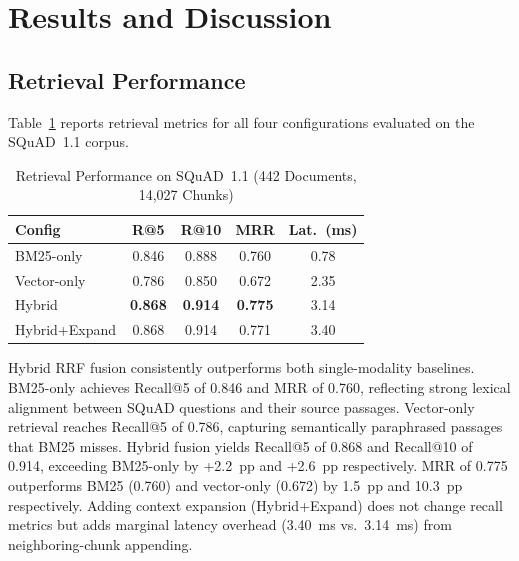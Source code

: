 \documentclass[conference]{IEEEtran}
\begin{document}
\section{Results and Discussion}

\subsection{Retrieval Performance}

Table~\ref{tab:retrieval} reports retrieval metrics for all four
configurations evaluated on the SQuAD~1.1 corpus.

\begin{table}[!t]
  \renewcommand{\arraystretch}{1.2}
  \caption{Retrieval Performance on SQuAD~1.1
           (442 Documents, 14{,}027 Chunks)}
  \label{tab:retrieval}
  \begin{center}
  \begin{tabular}{lcccc}
  \hline
  \textbf{Config} & \textbf{R@5} & \textbf{R@10} & \textbf{MRR}
                  & \textbf{Lat.\ (ms)} \\
  \hline
  BM25-only     & 0.846 & 0.888 & 0.760 & 0.78 \\
  Vector-only   & 0.786 & 0.850 & 0.672 & 2.35 \\
  Hybrid        & \textbf{0.868} & \textbf{0.914} & \textbf{0.775} & 3.14 \\
  Hybrid+Expand & 0.868 & 0.914 & 0.771 & 3.40 \\
  \hline
  \end{tabular}
  \end{center}
\end{table}

Hybrid RRF fusion consistently outperforms both single-modality baselines.
BM25-only achieves Recall@5 of 0.846 and MRR of 0.760, reflecting strong
lexical alignment between SQuAD questions and their source passages.
Vector-only retrieval reaches Recall@5 of 0.786, capturing semantically
paraphrased passages that BM25 misses.
Hybrid fusion yields Recall@5 of 0.868 and Recall@10 of 0.914, exceeding
BM25-only by +2.2~pp and +2.6~pp respectively.
MRR of 0.775 outperforms BM25 (0.760) and vector-only (0.672) by 1.5~pp
and 10.3~pp respectively. Adding context expansion (Hybrid+Expand) does not
change recall metrics but adds marginal latency overhead (3.40~ms vs.\
3.14~ms) from neighboring-chunk appending.
\end{document}
